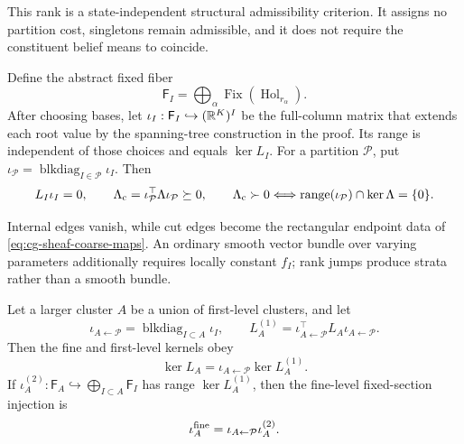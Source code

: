 This rank is a state-independent structural admissibility criterion. It assigns no
partition cost, singletons remain admissible, and it does not require the
constituent belief means to coincide. 

Define the abstract fixed fiber
\begin{equation}
\mathsf F_I
=\bigoplus_\alpha\operatorname{Fix}
(\operatorname{Hol}_{r_\alpha}).
\label{eq:cg-abstract-fixed-fiber}
\end{equation}
After choosing bases, let
\(\iota_I:\mathsf F_I\hookrightarrow(\mathbb R^K)^I\) be the full-column matrix
that extends each root value by the spanning-tree construction in the proof.
Its range is independent of those choices and equals \(\ker L_I\). For a
partition \(\mathcal P\), put
\(\iota_{\mathcal P}=\operatorname{blkdiag}_{I\in\mathcal P}\iota_I\).
Then
\begin{equation}
L_I\iota_I=0,\qquad
\Lambda_{\rm c}=\iota_{\mathcal P}^\top\Lambda
\iota_{\mathcal P}\succeq0,\qquad
\Lambda_{\rm c}\succ0
\Longleftrightarrow
\operatorname{range}(\iota_{\mathcal P})\cap\ker\Lambda=\{0\}.
\label{eq:cg-partial-properness}
\end{equation}

Internal edges vanish, while cut edges become the
rectangular endpoint data of \eqref{eq:cg-sheaf-coarse-maps}. An ordinary
smooth vector bundle over varying parameters additionally requires locally
constant \(f_I\); rank jumps produce strata rather than a smooth bundle.

Let a larger cluster \(A\) be a union of first-level clusters, and let
\begin{equation}
\iota_{A\leftarrow\mathcal P}
=\operatorname{blkdiag}_{I\subset A}\iota_I,
\qquad
L_A^{(1)}
=\iota_{A\leftarrow\mathcal P}^\top L_A
\iota_{A\leftarrow\mathcal P}.
\label{eq:cg-nested-first-compression}
\end{equation}
Then the fine and first-level kernels obey
\begin{equation}
\ker L_A
=\iota_{A\leftarrow\mathcal P}\ker L_A^{(1)}.
\label{eq:cg-nested-fixed-sections}
\end{equation}
If
\(\iota_A^{(2)}:\mathsf F_A\hookrightarrow
\bigoplus_{I\subset A}\mathsf F_I\) has range \(\ker L_A^{(1)}\), then the
fine-level fixed-section injection is
\begin{equation}
\iota_A^{\rm fine}
=\iota_{A\leftarrow\mathcal P}\iota_A^{(2)}.
\label{eq:cg-nested-injection-composition}
\end{equation}

